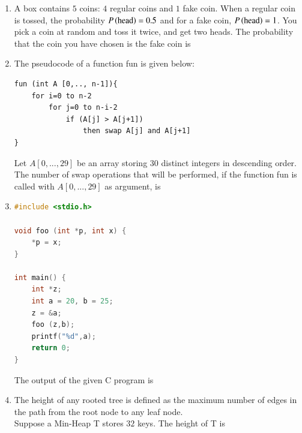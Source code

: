 \documentclass[a4paper, 11pt]{article}
\begin{document}
\begin{enumerate}
    \hfill{}

    \item A box contains $5$ coins: $4$ regular coins and $1$ fake coin. When a regular coin is tossed, the probability $P\left(\text{head}\right)=0.5$ and for a fake coin, $P\left(\text{head}\right)=1$. You pick a coin at random and toss it twice, and get two heads. The probability that the coin you have chosen is the fake coin is \underline{\hspace{2cm}} 

    \hfill{}

    \item The pseudocode of a function fun \brak{} is given below:
    \begin{lstlisting}
fun (int A [0,.., n-1]){
    for i=0 to n-2
        for j=0 to n-i-2
            if (A[j] > A[j+1])
                then swap A[j] and A[j+1]
}
    \end{lstlisting}
    Let $A[0,...,29]$ be an array storing $30$ distinct integers in descending order. The number of swap operations that will be performed, if the function fun \brak{} is called with $A[0,...,29]$ as argument, is \underline{\hspace{2cm}} 

    \hfill{}

    \item 
    \begin{lstlisting}[language=C]
#include <stdio.h>

void foo (int *p, int x) {
    *p = x;
}

int main() {
    int *z;
    int a = 20, b = 25;
    z = &a;
    foo (z,b);
    printf("%d",a);
    return 0;
}
    \end{lstlisting}
    The output of the given C program is \underline{\hspace{2cm}} 

    \hfill{}

    \item The height of any rooted tree is defined as the maximum number of edges in the path from the root node to any leaf node.\\Suppose a Min-Heap T stores $32$ keys. The height of T is \underline{\hspace{2cm}} 

    \hfill{}


\end{enumerate}
\end{document}
